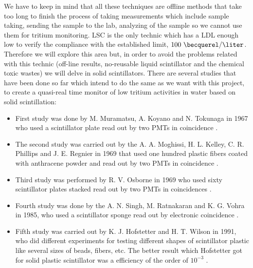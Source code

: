 We have to keep in mind that all these techniques are offline methods that take too long to finish the process of taking measurements which include sample taking, sending the sample to the lab, analyzing of the sample so we cannot use them for tritium monitoring. LSC is the only technic which has a LDL enough low to verify the compliance with the established limit, $100~\becquerel/\liter$. Therefore we will explore this area but, in order to avoid the problems related with this technic (off-line results, no-reusable liquid scintillator and the chemical toxic wastes) we will delve in solid scintillators. There are several studies that have been done so far which intend to do the same as we want with this project, to create a quasi-real time monitor of low tritium activities in water based on solid scintillation:

\begin{itemize}

\item{} First study was done by M. Muramatsu, A. Koyano and N. Tokunaga in 1967 who used a scintillator plate read out by two PMTs in coincidence \cite{Muramatsu}.

\item{} The second study was carried out by the A. A. Moghissi, H. L. Kelley, C. R. Phillips and J. E. Regnier in 1969 that used one hundred plastic fibers coated with anthracene powder and read out by two PMTs in coincidence \cite{Moghissi}.

\item{} Third study was performed by R. V. Osborne in 1969 who used sixty scintillator plates stacked read out by two PMTs in coincidences \cite{Osborne}.

\item{} Fourth study was done by the A. N. Singh, M. Ratnakaran and K. G. Vohra in 1985, who used a scintillator sponge read out by electronic coincidence \cite{Ratnakaran}\cite{Ratnakaran2000}.

\item{} Fifth study was carried out by K. J. Hofstetter and H. T. Wilson in 1991, who did different experiments for testing different shapes of scintillator plastic like several sizes of beads, fibers, etc. The better result which Hofstetter got for solid plastic scintillator was a efficiency of the order of $10^{-3}$ \cite{Hofstetter1}\cite{Hofstetter2}.

\end{itemize}

